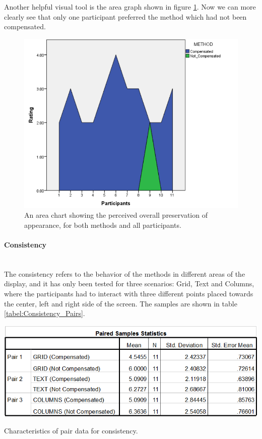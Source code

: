 \documentclass[]{article}
\begin{document}
Another helpful visual tool is the area graph shown in figure \ref{fig:OPOA_Area}. Now we can more clearly see that only one participant preferred the method which had not been compensated.

\begin{figure}[!h]
    \centering
    \includegraphics[width=1.0\textwidth]{figures/results/OPOA_Area.PNG}
    \caption{An area chart showing the perceived overall preservation of appearance, for both methods and all participants.}
    \label{fig:OPOA_Area}
\end{figure}

\paragraph{Consistency}\mbox{}\\

The consistency refers to the behavior of the methods in different areas of the display, and it has only been tested for three scenarios: Grid, Text and Columns, where the participants had to interact with three different points placed towards the center, left and right side of the screen. The samples are shown in table \ref{tabel:Consistency_Pairs}.

\begin{table}[!h]
  \includegraphics[width=\linewidth]{figures/results/Consistency_Pairs.PNG}
  \caption{Characteristics of pair data for consistency.}
  \label{tabel:Consistency_Pairs}
\end{table}
\end{document}
